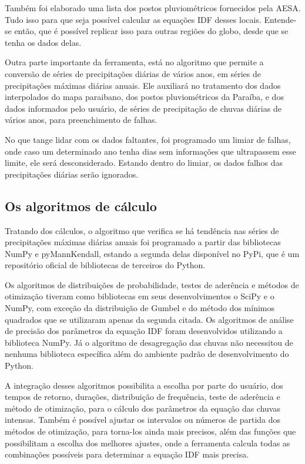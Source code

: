 Também foi elaborado uma lista dos postos pluviométricos fornecidos pela AESA. Tudo isso para que seja possível calcular as equações IDF desses locais. Entende-se então, que é possível replicar isso para outras regiões do globo, desde que se tenha os dados delas. 

Outra parte importante da ferramenta, está no algoritmo que permite a conversão de séries de precipitações diárias de vários anos, em séries de precipitações máximas diárias anuais. Ele auxiliará no tratamento dos dados interpolados do mapa paraibano, dos postos pluviométricos da Paraíba, e dos dados informados pelo usuário, de séries de precipitação de chuvas diárias de vários anos, para preenchimento de falhas.

No que tange lidar com os dados faltantes, foi programado um limiar de falhas, onde caso um determinado ano tenha dias sem informações que ultrapassem esse limite, ele será desconsiderado. Estando dentro do limiar, os dados falhos das precipitações diárias serão ignorados.

\subsection{Os algoritmos de cálculo}

Tratando dos cálculos, o algoritmo que verifica se há tendência nas séries de precipitações máximas diárias anuais foi programado a partir das bibliotecas NumPy e pyMannKendall, estando a segunda delas disponível no PyPi, que é um repositório oficial de bibliotecas de terceiros do Python. 

Os algoritmos de distribuições de probabilidade, testes de aderência e métodos de otimização tiveram como bibliotecas em seus desenvolvimentos o SciPy e o NumPy, com exceção da distribuição de Gumbel e do método dos mínimos quadrados que se utilizaram apenas da segunda citada. Os algoritmos de análise de precisão dos parâmetros da equação IDF foram desenvolvidos utilizando a biblioteca NumPy. Já o algoritmo de desagregação das chuvas não necessitou de nenhuma biblioteca específica além do ambiente padrão de desenvolvimento do Python.

A integração desses algoritmos possibilita a escolha por parte do usuário, dos tempos de retorno, durações, distribuição de frequência, teste de aderência e método de otimização, para o cálculo dos parâmetros da equação das chuvas intensas. Também é possível ajustar os intervalos ou números de partida dos métodos de otimização, para torna-los ainda mais precisos, além das funções que possibilitam a escolha dos melhores ajustes, onde a ferramenta calcula todas as combinações possíveis para determinar a equação IDF mais precisa.

